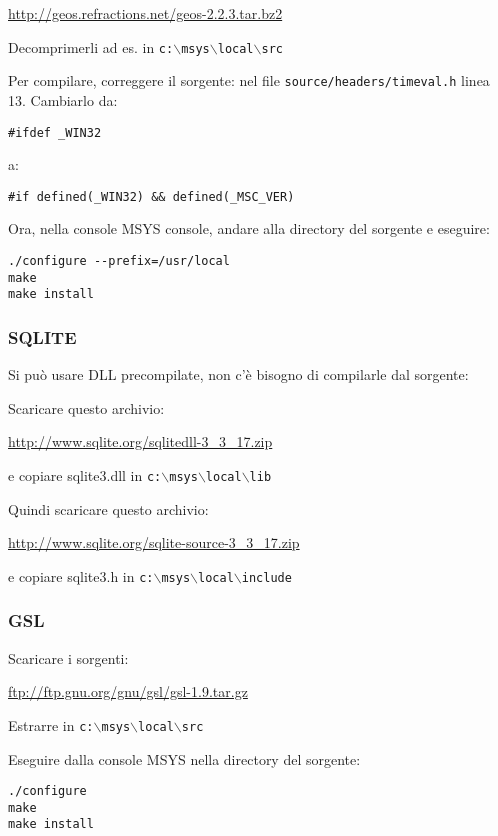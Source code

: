 \url{http://geos.refractions.net/geos-2.2.3.tar.bz2}

Decomprimerli ad es. in \texttt{c:$\backslash$msys$\backslash$local$\backslash$src}

Per compilare, correggere il sorgente: nel file \texttt{source/headers/timeval.h} linea 13.
Cambiarlo da:

\begin{verbatim}
#ifdef _WIN32
\end{verbatim}
a:

\begin{verbatim}
#if defined(_WIN32) && defined(_MSC_VER)
\end{verbatim}

Ora, nella console MSYS console, andare alla directory del sorgente e eseguire:

\begin{verbatim}
./configure --prefix=/usr/local
make
make install
\end{verbatim}

\subsubsection{SQLITE}
Si può usare DLL precompilate, non c'è bisogno di compilarle dal sorgente:

Scaricare questo archivio:


\url{http://www.sqlite.org/sqlitedll-3\_3\_17.zip}

e copiare sqlite3.dll in \texttt{c:$\backslash$msys$\backslash$local$\backslash$lib}

Quindi scaricare questo archivio:

\url{http://www.sqlite.org/sqlite-source-3\_3\_17.zip}

e copiare sqlite3.h in \texttt{c:$\backslash$msys$\backslash$local$\backslash$include}

\subsubsection{GSL}
Scaricare i sorgenti:

\url{ftp://ftp.gnu.org/gnu/gsl/gsl-1.9.tar.gz}

Estrarre in \texttt{c:$\backslash$msys$\backslash$local$\backslash$src}

Eseguire dalla console MSYS nella directory del sorgente:

\begin{verbatim}
./configure
make
make install
\end{verbatim}


